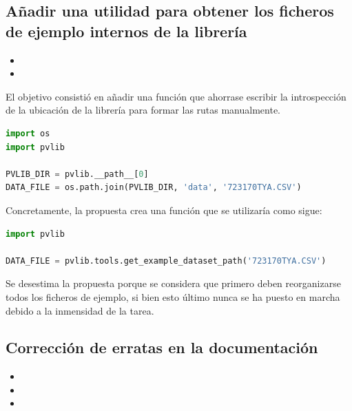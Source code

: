 \subsection{Añadir una utilidad para obtener los ficheros de ejemplo internos de la librería}

\begin{itemize}
    \item {}
    \item {}
\end{itemize}

El objetivo consistió en añadir una función que ahorrase escribir la introspección de la ubicación de la librería para formar las rutas manualmente.

\begin{lstlisting}[language=python, caption={Fragmento de código utilizado normalmente para obtener la ruta de los ficheros de la librería}, label={lst:example_files_current}]
import os
import pvlib

PVLIB_DIR = pvlib.__path__[0]
DATA_FILE = os.path.join(PVLIB_DIR, 'data', '723170TYA.CSV')
\end{lstlisting}

Concretamente, la propuesta crea una función que se utilizaría como sigue:

\begin{lstlisting}[language=python, caption={Fragmento de código utilizando la función propuesta para obtener la ruta de los ficheros de la librería}, label={lst:example_files_proposal}]
import pvlib

DATA_FILE = pvlib.tools.get_example_dataset_path('723170TYA.CSV')
\end{lstlisting}

Se desestima la propuesta porque se considera que primero deben reorganizarse todos los ficheros de ejemplo, si bien esto último nunca se ha puesto en marcha debido a la inmensidad de la tarea.

\subsection{Corrección de erratas en la documentación}

\begin{itemize}
    \item {}
    \item {}
    \item {}
\end{itemize}


